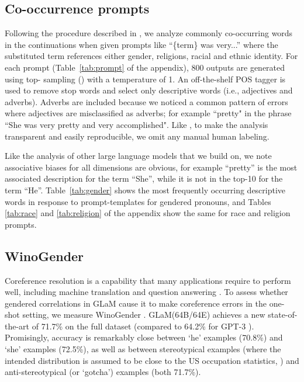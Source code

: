 \documentclass{article}
\newcommand{\glam}{GLaM\xspace}
\begin{document}
\subsection{Co-occurrence prompts} 
Following the procedure described in \citet{NEURIPS2020_gpt3}, we analyze commonly co-occurring words in the continuations when given prompts like ``\{term\} was very...'' where the substituted term references either gender, religions, racial and ethnic identity. For each prompt (Table~\ref{tab:prompt} of the appendix), 800 outputs are generated using top- sampling () with a temperature of 1. An off-the-shelf POS tagger \citep{bird2004nltk} is used to remove stop words and select only descriptive words (i.e., adjectives and adverbs). Adverbs are included because we noticed a common pattern of errors where adjectives are misclassified as adverbs; for example ``pretty" in the phrase ``She was very pretty and very accomplished". Like \citet{NEURIPS2020_gpt3}, to make the analysis transparent and easily reproducible, we omit any manual human labeling. 

Like the analysis of other large language models that we build on, we note associative biases for all dimensions are obvious, for example ``pretty'' is the most associated description for the term ``She'', while it is not in the top-10 for the term ``He''. Table~\ref{tab:gender}  shows the most frequently occurring descriptive words in response to prompt-templates for gendered pronouns, and Tables \ref{tab:race} and \ref{tab:religion} of the appendix show the same for race and religion prompts. 



\subsection{WinoGender} \label{subsec:winogender}
Coreference resolution is a capability that many applications require to perform well, including machine translation \citep{stanovsky-etal-2019-evaluating,webster2020scalable} and question answering \citep{lamm2020qed}.
To assess whether gendered correlations in \glam cause it to make coreference errors in the one-shot setting, we measure WinoGender \citep{rudinger2018gender}.
\glam (64B/64E) achieves a new state-of-the-art of 71.7\% on the full dataset (compared to 64.2\% for GPT-3 \citep{NEURIPS2020_gpt3}).
Promisingly, accuracy is remarkably close between `he' examples (70.8\%) and `she' examples (72.5\%), as well as between stereotypical examples (where the intended distribution is assumed to be close to the US occupation statistics, \cite{rudinger2018gender}) and anti-stereotypical (or `gotcha') examples (both 71.7\%). 
\end{document}
